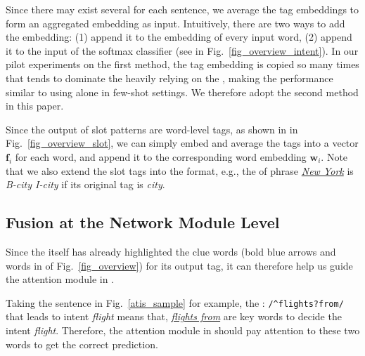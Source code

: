 Since there may exist several \REtags for each sentence, we average the tag embeddings to form an aggregated embedding as input.
Intuitively, there are two ways to add the embedding: (1) append it to the embedding of every input word, (2) append it to the input of the softmax classifier (see  in Fig.~\ref{fig_overview_intent}).
In our pilot experiments on the first method, the tag embedding is copied so many times that tends to dominate the \NN heavily relying on the \REtags, making the performance similar to using \RE alone in few-shot settings. We therefore adopt the second method in this paper.

Since the output of slot \RE patterns are word-level tags, as shown in  in Fig.~\ref{fig_overview_slot}, we can simply embed
and average the \RE tags into a vector $\textbf{f}_i$ for each word, and append it to the corresponding word embedding $\textbf{w}_i$.
Note that we also extend the slot \RE tags into the \BIO format, e.g.,
the \REtag of phrase \textsl{\underline{New York}} is \emph{B-city I-city} if its original tag is \emph{city}.

\subsection{Fusion at the Network Module Level}
\label{interact_with_module}
Since the \RE itself has already highlighted the clue words (bold blue arrows and words in  of Fig.~\ref{fig_overview}) for its output tag, it can therefore help us guide the attention module in \NN.

Taking the sentence in Fig.~\ref{atis_sample} for example, the {\small \RE: \texttt{/\textasciicircum flights?\:from/} } that leads to intent \emph{flight} means that, \textsl{\underline{flights from}} are key words to decide the intent \emph{flight}. Therefore, the attention module in \NN should pay attention to these two words to get the correct prediction.

